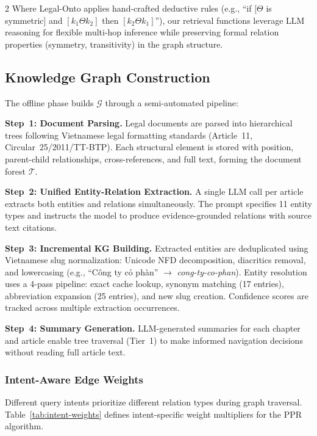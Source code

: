 \documentclass[11pt,a4paper]{article}
\begin{document}
\begin{multicols}{2}
Where Legal-Onto applies hand-crafted deductive rules (e.g., ``if $[\Theta$ is symmetric$]$ and $[k_1 \Theta k_2]$ then $[k_2 \Theta k_1]$''), our retrieval functions leverage LLM reasoning for flexible multi-hop inference while preserving formal relation properties (symmetry, transitivity) in the graph structure.

\subsection{Knowledge Graph Construction}

The offline phase builds $\mathcal{G}$ through a semi-automated pipeline:

\textbf{Step~1: Document Parsing.} Legal documents are parsed into hierarchical trees following Vietnamese legal formatting standards (Article~11, Circular~25/2011/TT-BTP). Each structural element is stored with position, parent-child relationships, cross-references, and full text, forming the document forest $\mathcal{T}$.

\textbf{Step~2: Unified Entity-Relation Extraction.} A single LLM call per article extracts both entities and relations simultaneously. The prompt specifies 11 entity types and instructs the model to produce evidence-grounded relations with source text citations.

\textbf{Step~3: Incremental KG Building.} Extracted entities are deduplicated using Vietnamese slug normalization: Unicode NFD decomposition, diacritics removal, and lowercasing (e.g., ``C\^ong ty c\h{o} ph\`an'' $\to$ \textit{cong-ty-co-phan}). Entity resolution uses a 4-pass pipeline: exact cache lookup, synonym matching (17 entries), abbreviation expansion (25 entries), and new slug creation. Confidence scores are tracked across multiple extraction occurrences.

\textbf{Step~4: Summary Generation.} LLM-generated summaries for each chapter and article enable tree traversal (Tier~1) to make informed navigation decisions without reading full article text.

\subsubsection{Intent-Aware Edge Weights}

Different query intents prioritize different relation types during graph traversal. Table~\ref{tab:intent-weights} defines intent-specific weight multipliers for the PPR algorithm.


\end{multicols}
\end{document}
